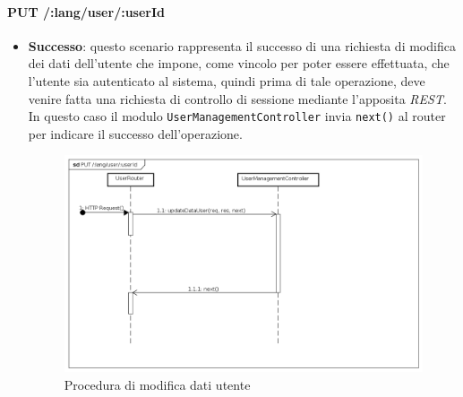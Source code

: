 \paragraph{PUT /:lang/user/:userId}
\begin{itemize}
\item \textbf{Successo}: questo scenario rappresenta il successo di una richiesta di modifica dei dati dell'utente che impone, come vincolo per poter essere effettuata, che l'utente sia autenticato al sistema, quindi prima di tale operazione, deve venire fatta una richiesta di controllo di sessione mediante l'apposita \textit{REST}. 
In questo caso il modulo \texttt{UserManagementController} invia \texttt{next()} al router per indicare il successo dell'operazione.
\label{Procedura di modifica dati utente}
\begin{figure}[ht]
	\centering
	\includegraphics[scale=0.40]{UML/DiagrammiDiSequenza/Back-end/PUT_LangUserUseridSuccess.png}
	\caption{Procedura di modifica dati utente}
\end{figure}
\FloatBarrier


\end{itemize}
